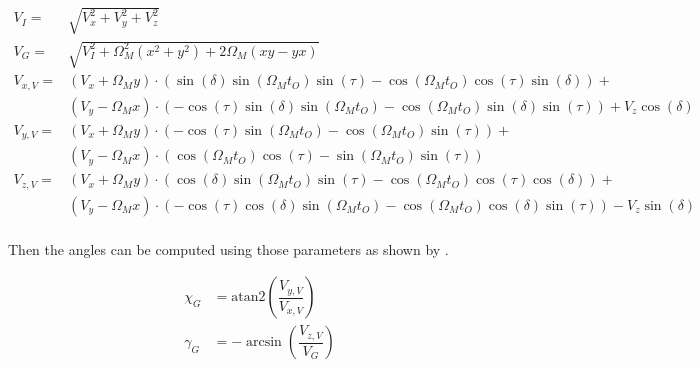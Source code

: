 \begin{equation} \label{eq:intermediateParameters}
\begin{split}
V_{I}=&\sqrt{V_{x}^{2}+V_{y}^{2}+V_{z}^{2}}\\
V_{G}=&\sqrt{V_{I}^{2}+\Omega_{M}^{2}\left(x^{2}+y^{2}\right)+2\Omega_{M}\left(xy-yx\right)}\\
V_{x,V}=&\left(V_{x}+\Omega_{M}y\right)\cdot \left(\sin\left(\delta\right)\sin\left(\Omega_{M}t_{O}\right)\sin\left(\tau\right)-\cos\left(\Omega_{M}t_{O}\right)\cos\left(\tau\right)\sin\left(\delta	\right)\right)+\\
&\left(V_{y}-\Omega_{M}x\right)\cdot \left(-\cos\left(\tau\right)\sin\left(\delta\right)\sin\left(\Omega_{M}t_{O}\right)-\cos\left(\Omega_{M}t_{O}\right)\sin\left(\delta\right)\sin\left(\tau\right)\right)+V_{z}\cos\left(\delta\right)\\
V_{y,V}=&\left(V_{x}+\Omega_{M}y\right)\cdot \left(-\cos\left(\tau\right)\sin\left(\Omega_{M}t_{O}\right)-\cos\left(\Omega_{M}t_{O}\right)\sin\left(\tau\right)\right)+\\
&\left(V_{y}-\Omega_{M}x\right)\cdot \left(\cos\left(\Omega_{M}t_{O}\right)\cos\left(\tau\right)-\sin\left(\Omega_{M}t_{O}\right)\sin\left(\tau\right)\right)\\
V_{z,V}=&\left(V_{x}+\Omega_{M}y\right)\cdot \left(\cos\left(\delta\right)\sin\left(\Omega_{M}t_{O}\right)\sin\left(\tau\right)-\cos\left(\Omega_{M}t_{O}\right)\cos\left(\tau\right)\cos\left(\delta	\right)\right)+\\
&\left(V_{y}-\Omega_{M}x\right)\cdot \left(-\cos\left(\tau\right)\cos\left(\delta\right)\sin\left(\Omega_{M}t_{O}\right)-\cos\left(\Omega_{M}t_{O}\right)\cos\left(\delta\right)\sin\left(\tau\right)\right)-V_{z}\sin\left(\delta\right)\\
\end{split}
\end{equation}

Then the angles can be computed using those parameters as shown by .


\begin{equation} \label{eq:fpaAndazimuth}
\begin{split}
\chi_{G}&=\text{atan2}\left(\dfrac{V_{y,V}}{V_{x,V}}\right)\\
\gamma_{G}&=-\arcsin\left(\dfrac{V_{z,V}}{V_{G}}\right)\\
\end{split}
\end{equation}

